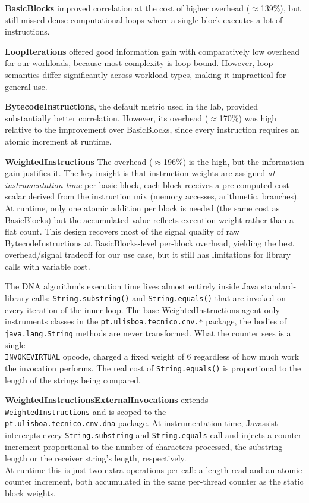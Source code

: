 \documentclass[10pt]{article}
\begin{document}
\textbf{BasicBlocks} improved correlation at the cost of higher overhead ($\approx$139\%), but still missed dense computational loops where a single block executes a lot of instructions.

\textbf{LoopIterations} offered good information gain with comparatively low overhead for our workloads, because most complexity is loop-bound. However, loop semantics differ significantly across workload types, making it impractical for general use.

\textbf{BytecodeInstructions}, the default metric used in the lab, provided substantially better correlation. However, its overhead ($\approx$170\%) was high relative to the improvement over BasicBlocks, since every instruction requires an atomic increment at runtime.

\textbf{WeightedInstructions} The overhead ($\approx$196\%) is the high, but the information gain justifies it. The key insight is that instruction weights are assigned \emph{at instrumentation time} per basic block, each block receives a pre-computed cost scalar derived
from the instruction mix (memory accesses, arithmetic, branches). At runtime,
only one atomic addition per block is needed (the same cost as BasicBlocks) but
the accumulated value reflects execution weight rather than a flat count. This
design recovers most of the signal quality of raw BytecodeInstructions at
BasicBlocks-level per-block overhead, yielding the best overhead/signal tradeoff
for our use case, but it still has limitations for library calls with variable cost.

The DNA algorithm's execution time lives almost entirely inside Java standard-library
calls: \texttt{String.sub\-string()} and \texttt{String.equals()} that are invoked on
every iteration of the inner loop. The base WeightedInstructions agent
only instruments classes in the \texttt{pt.ulisboa.tecnico.cnv.*} package, the bodies
of \texttt{java.lang.String} methods are never transformed. What the counter sees is a
single \\ \texttt{INVOKEVIRTUAL} opcode, charged a fixed weight of 6
regardless of how much work the invocation performs. The real cost of \texttt{String.equals()}
is proportional to the length of the strings being compared.

\textbf{WeightedInstructionsExternalInvocations} extends \\ \texttt{WeightedInstructions}
and is scoped to the \\ \texttt{pt.ulisboa.tecnico.cnv.dna} package.
At instrumentation time, Javassist intercepts every
\texttt{String.substring} and \texttt{String.equals} call and injects
a counter increment proportional to the number of characters processed, the substring
length or the receiver string's length, respectively. \\
At runtime this is just two extra operations per call: a length read and an atomic counter
increment, both accumulated in the same per-thread counter as the static block weights.
\end{document}
